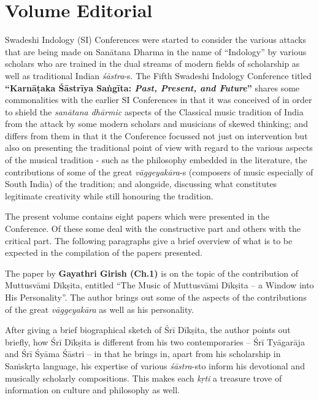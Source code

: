 
\chapter*{Volume Editorial}\label{volumeeditorial}

Swadeshi Indology (SI) Conferences were started to consider the various attacks that are being made on Sanātana Dharma in the name of “Indology” by various scholars who are trained in the dual streams of modern fields of scholarship as well as traditional Indian \textit{śāstra}-s. The Fifth Swadeshi Indology Conference titled \textbf{“Karnāṭaka Śāstrīya Saṅgīta: \textit{Past, Present, and Future}”} shares some commonalities with the earlier SI Conferences in that it was conceived of in order to shield the \textit{sanātana dhārmic} aspects of the Classical music tradition of India from the attack by some modern scholars and musicians of skewed thinking; and differs from them in that it the Conference focussed not just on intervention but also on presenting the traditional point of view with regard to the various aspects of the musical tradition - such as the philosophy embedded in the literature, the contributions of some of the great \textit{vāggeyakāra}-s (composers of music especially of South India) of the tradition; and alongside, discussing what constitutes legitimate creativity while still honouring the tradition.

The present volume contains eight papers which were presented in the Conference. Of these some deal with the constructive part and others with the critical part. The following paragraphs give a brief overview of what is to be expected in the compilation of the papers presented.

\delimiter

The paper by \textbf{Gayathri Girish (Ch.1)} is on the topic of the contribution of Muttusvāmi Dīkṣita, entitled “The Music of Muttusvāmi Dīkṣita – a Window into His Personality”. The author brings out some of the aspects of the contributions of the great \textit{vāggeyakāra} as well as his personality.

After giving a brief biographical sketch of Śrī Dīkṣita, the author points out briefly, how Śrī Dīkṣita is different from his two contemporaries – Śrī Tyāgarāja and Śrī Śyāma Śāstri – in that he brings in, apart from his scholarship in Saṁskṛta language, his expertise of various \textit{śāstra}-s\break to inform his devotional and musically scholarly compositions. This makes each \textit{kṛti} a treasure trove of information on culture and philosophy as well. 

